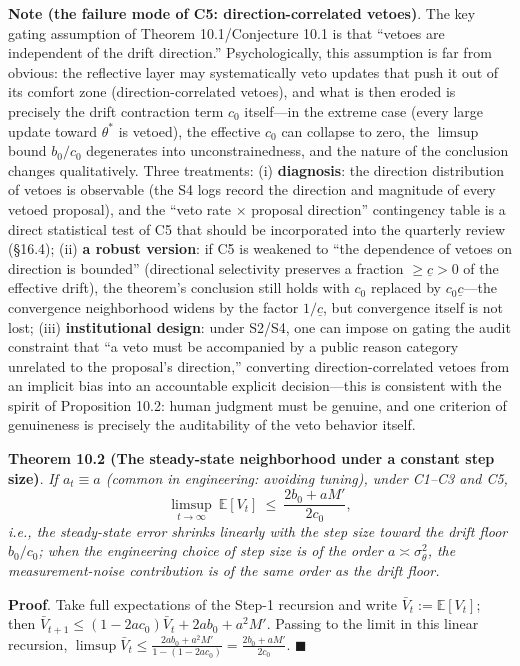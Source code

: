 \documentclass[
  11pt]{article}
\begin{document}
\textbf{Note (the failure mode of C5: direction-correlated vetoes)}. The
key gating assumption of Theorem 10.1/Conjecture 10.1 is that ``vetoes
are independent of the drift direction.'' Psychologically, this
assumption is far from obvious: the reflective layer may systematically
veto updates that push it out of its comfort zone (direction-correlated
vetoes), and what is then eroded is precisely the drift contraction term
\(c_0\) itself---in the extreme case (every large update toward
\(\theta^*\) is vetoed), the effective \(c_0\) can collapse to zero, the
\(\limsup\) bound \(b_0/c_0\) degenerates into unconstrainedness, and
the nature of the conclusion changes qualitatively. Three treatments:
(i) \textbf{diagnosis}: the direction distribution of vetoes is
observable (the S4 logs record the direction and magnitude of every
vetoed proposal), and the ``veto rate × proposal direction'' contingency
table is a direct statistical test of C5 that should be incorporated
into the quarterly review (§16.4); (ii) \textbf{a robust version}: if C5
is weakened to ``the dependence of vetoes on direction is bounded''
(directional selectivity preserves a fraction \(\ge \underline c > 0\)
of the effective drift), the theorem's conclusion still holds with
\(c_0\) replaced by \(c_0 \underline c\)---the convergence neighborhood
widens by the factor \(1/\underline c\), but convergence itself is not
lost; (iii) \textbf{institutional design}: under S2/S4, one can impose
on gating the audit constraint that ``a veto must be accompanied by a
public reason category unrelated to the proposal's direction,''
converting direction-correlated vetoes from an implicit bias into an
accountable explicit decision---this is consistent with the spirit of
Proposition 10.2: human judgment must be genuine, and one criterion of
genuineness is precisely the auditability of the veto behavior itself.

\textbf{Theorem 10.2 (The steady-state neighborhood under a constant
step size)}. \emph{If \(a_t \equiv a\) (common in engineering: avoiding
tuning), under C1--C3 and C5,}
\[\limsup_{t\to\infty}\ \mathbb{E}[V_t] \ \le\ \frac{2b_0 + aM'}{2c_0},\]
\emph{i.e., the steady-state error shrinks linearly with the step size
toward the drift floor \(b_0/c_0\); when the engineering choice of step
size is of the order \(a \asymp \sigma_\theta^2\), the measurement-noise
contribution is of the same order as the drift floor.}

\textbf{Proof}. Take full expectations of the Step-1 recursion and write
\(\bar V_t := \mathbb{E}[V_t]\); then
\(\bar V_{t+1} \le (1-2ac_0)\bar V_t + 2ab_0 + a^2M'\). Passing to the
limit in this linear recursion,
\(\limsup \bar V_t \le \frac{2ab_0 + a^2M'}{1-(1-2ac_0)} = \frac{2b_0 + aM'}{2c_0}\).
\(\blacksquare\)
\end{document}
